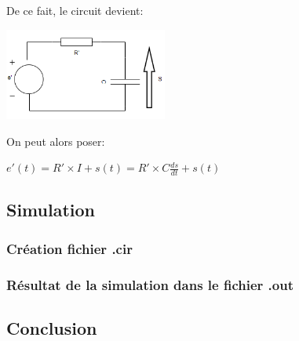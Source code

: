 \documentclass[a4paper,12pt,titlepage]{article}
\begin{document}
De ce fait, le circuit devient: 
\begin{center}
    \includegraphics[width=0.4\textwidth]{Exo4/Exo4-3.PNG}\\
\end{center}
On peut alors poser: 
\begin{center}
    $e'(t) = R'\times I + s(t) = R'\times C\frac{ds}{dt} + s(t) $
\end{center}


\subsection{Simulation}
\subsubsection{Création fichier .cir}
\subsubsection{Résultat de la simulation dans le fichier .out}
\subsection{Conclusion}
\end{document}

